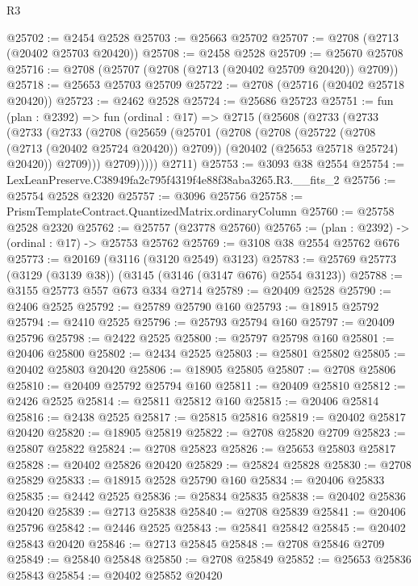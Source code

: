 \begin{lexlean}{R3}
\begin{coremodule}
@25702 := @2454 @2528
@25703 := @25663 @25702
@25707 := @2708 (@2713 (@20402 @25703 @20420))
@25708 := @2458 @2528
@25709 := @25670 @25708
@25716 := @2708 (@25707 (@2708 (@2713 (@20402 @25709 @20420)) @2709))
@25718 := @25653 @25703 @25709
@25722 := @2708 (@25716 (@20402 @25718 @20420))
@25723 := @2462 @2528
@25724 := @25686 @25723
@25751 := fun (plan : @2392) =>
  fun (ordinal : @17) =>
  @2715
    (@25608
      (@2733
        (@2733
          (@2733
            (@2733
              (@2708
                (@25659
                  (@25701
                    (@2708
                      (@2708
                        (@25722 (@2708 (@2713 (@20402 @25724 @20420)) @2709))
                        (@20402 (@25653 @25718 @25724) @20420))
                      @2709)))
                @2709)))))
      @2711)
@25753 := @3093 @38 @2554
@25754 := LexLeanPreserve.C38949fa2c795f4319f4e88f38aba3265.R3.__fits_2
@25756 := @25754 @2528 @2320
@25757 := @3096 @25756
@25758 := PrismTemplateContract.QuantizedMatrix.ordinaryColumn
@25760 := @25758 @2528 @2320
@25762 := @25757 (@23778 @25760)
@25765 := (plan : @2392) -> (ordinal : @17) -> @25753 @25762
@25769 := @3108 @38 @2554 @25762 @676
@25773 := @20169 (@3116 (@3120 @2549) @3123)
@25783 := @25769 @25773 (@3129 (@3139 @38)) (@3145 (@3146 (@3147 @676) @2554 @3123))
@25788 := @3155 @25773 @557 @673 @334 @2714
@25789 := @20409 @2528
@25790 := @2406 @2525
@25792 := @25789 @25790 @160
@25793 := @18915 @25792
@25794 := @2410 @2525
@25796 := @25793 @25794 @160
@25797 := @20409 @25796
@25798 := @2422 @2525
@25800 := @25797 @25798 @160
@25801 := @20406 @25800
@25802 := @2434 @2525
@25803 := @25801 @25802
@25805 := @20402 @25803 @20420
@25806 := @18905 @25805
@25807 := @2708 @25806
@25810 := @20409 @25792 @25794 @160
@25811 := @20409 @25810
@25812 := @2426 @2525
@25814 := @25811 @25812 @160
@25815 := @20406 @25814
@25816 := @2438 @2525
@25817 := @25815 @25816
@25819 := @20402 @25817 @20420
@25820 := @18905 @25819
@25822 := @2708 @25820 @2709
@25823 := @25807 @25822
@25824 := @2708 @25823
@25826 := @25653 @25803 @25817
@25828 := @20402 @25826 @20420
@25829 := @25824 @25828
@25830 := @2708 @25829
@25833 := @18915 @2528 @25790 @160
@25834 := @20406 @25833
@25835 := @2442 @2525
@25836 := @25834 @25835
@25838 := @20402 @25836 @20420
@25839 := @2713 @25838
@25840 := @2708 @25839
@25841 := @20406 @25796
@25842 := @2446 @2525
@25843 := @25841 @25842
@25845 := @20402 @25843 @20420
@25846 := @2713 @25845
@25848 := @2708 @25846 @2709
@25849 := @25840 @25848
@25850 := @2708 @25849
@25852 := @25653 @25836 @25843
@25854 := @20402 @25852 @20420

\end{coremodule}
\end{lexlean}

